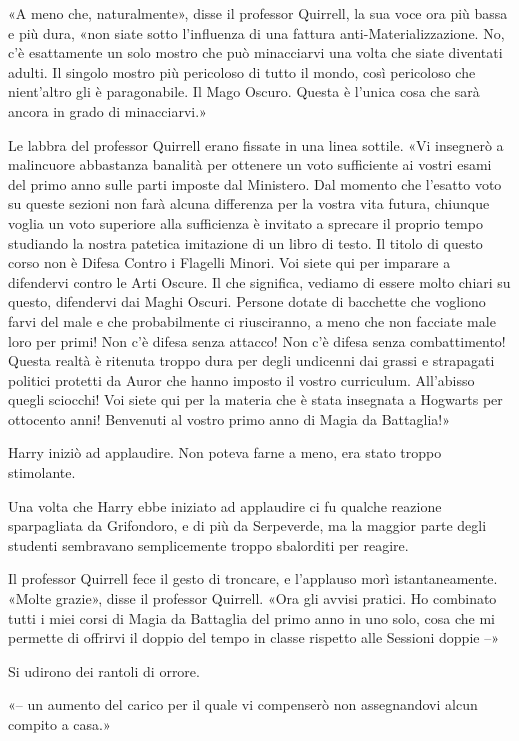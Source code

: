 «A meno che, naturalmente», disse il professor Quirrell, la sua voce ora più bassa e più dura, «non siate sotto l’influenza di una fattura anti-Materializzazione. No, c’è esattamente un solo mostro che può minacciarvi una volta che siate diventati adulti. Il singolo mostro più pericoloso di tutto il mondo, così pericoloso che nient’altro gli è paragonabile. Il Mago Oscuro. Questa è l’unica cosa che sarà ancora in grado di minacciarvi.»

Le labbra del professor Quirrell erano fissate in una linea sottile. «Vi insegnerò a malincuore abbastanza banalità per ottenere un voto sufficiente ai vostri esami del primo anno sulle parti imposte dal Ministero. Dal momento che l’esatto voto su queste sezioni non farà alcuna differenza per la vostra vita futura, chiunque voglia un voto superiore alla sufficienza è invitato a sprecare il proprio tempo studiando la nostra patetica imitazione di un libro di testo. Il titolo di questo corso non è Difesa Contro i Flagelli Minori. Voi siete qui per imparare a difendervi contro le Arti Oscure. Il che significa, vediamo di essere molto chiari su questo, difendervi dai Maghi Oscuri. Persone dotate di bacchette che vogliono farvi del male e che probabilmente ci riusciranno, a meno che non facciate male loro per primi! Non c’è difesa senza attacco! Non c’è difesa senza combattimento! Questa realtà è ritenuta troppo dura per degli undicenni dai grassi e strapagati politici protetti da Auror che hanno imposto il vostro curriculum. All’abisso quegli sciocchi! Voi siete qui per la materia che è stata insegnata a Hogwarts per ottocento anni! Benvenuti al vostro primo anno di Magia da Battaglia!»

Harry iniziò ad applaudire. Non poteva farne a meno, era stato troppo stimolante.

Una volta che Harry ebbe iniziato ad applaudire ci fu qualche reazione sparpagliata da Grifondoro, e di più da Serpeverde, ma la maggior parte degli studenti sembravano semplicemente troppo sbalorditi per reagire.

Il professor Quirrell fece il gesto di troncare, e l’applauso morì istantaneamente. «Molte grazie», disse il professor Quirrell. «Ora gli avvisi pratici. Ho combinato tutti i miei corsi di Magia da Battaglia del primo anno in uno solo, cosa che mi permette di offrirvi il doppio del tempo in classe rispetto alle Sessioni doppie –»

Si udirono dei rantoli di orrore.

«– un aumento del carico per il quale vi compenserò non assegnandovi alcun compito a casa.»

